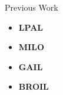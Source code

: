 \begin{block}{\normalsize {Previous Work} }
  \begin{itemize}
  	\item \textbf{LPAL}
	\item \textbf{MILO}
	\item \textbf{GAIL}
	\item \textbf{BROIL}
  \end{itemize}
\end{block}


